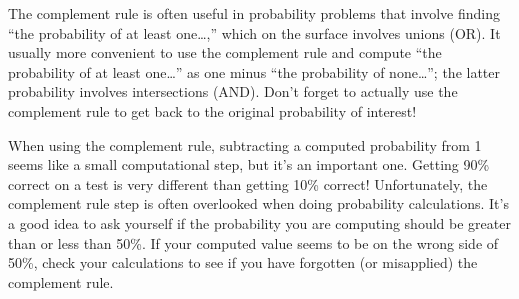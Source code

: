 \documentclass[
  letterpaper,
  DIV=11,
  numbers=noendperiod]{scrreprt}
\theoremstyle{plain}
\theoremstyle{definition}
\theoremstyle{definition}
\theoremstyle{definition}
\theoremstyle{remark}
\begin{document}
The complement rule is often useful in probability problems that involve
finding ``the probability of at least one\ldots,'' which on the surface
involves unions (OR). It usually more convenient to use the complement
rule and compute ``the probability of at least one\ldots{}'' as one
minus ``the probability of none\ldots{}''; the latter probability
involves intersections (AND). Don't forget to actually use the
complement rule to get back to the original probability of interest!

\begin{tcolorbox}[enhanced jigsaw, opacityback=0, rightrule=.15mm, coltitle=black, colframe=quarto-callout-warning-color-frame, toprule=.15mm, colbacktitle=quarto-callout-warning-color!10!white, opacitybacktitle=0.6, left=2mm, toptitle=1mm, breakable, title={Warning}, bottomtitle=1mm, colback=white, leftrule=.75mm, titlerule=0mm, arc=.35mm, bottomrule=.15mm]

When using the complement rule, subtracting a computed probability from
1 seems like a small computational step, but it's an important one.
Getting 90\% correct on a test is very different than getting 10\%
correct! Unfortunately, the complement rule step is often overlooked
when doing probability calculations. It's a good idea to ask yourself if
the probability you are computing should be greater than or less than
50\%. If your computed value seems to be on the wrong side of 50\%,
check your calculations to see if you have forgotten (or misapplied) the
complement rule.

\end{tcolorbox}
\end{document}
